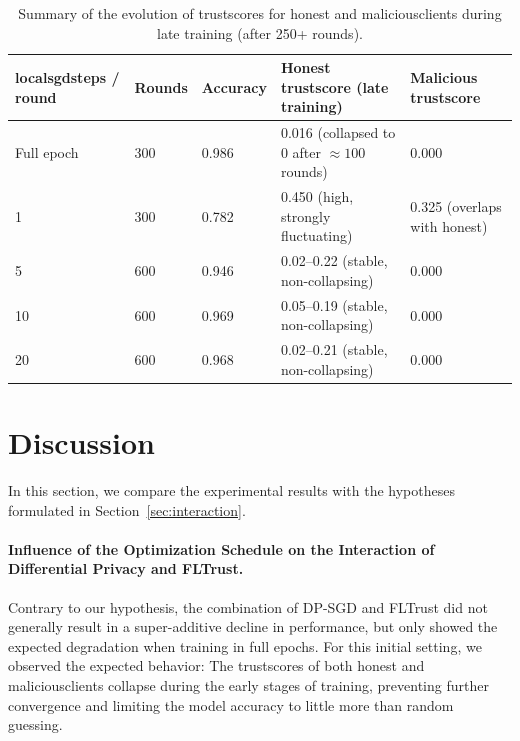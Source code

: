 \documentclass[11pt,twocolumn,a4paper,DIV=calc,parskip=half]{scrartcl}
\begin{document}
	\begin{table}[!h]
		\centering
		
		\begin{tabularx}{\textwidth}{|l|l|l|X|X|}
			\hline
			\textbf{\Glspl{localsgdstep} / round} & \textbf{Rounds} & \textbf{Accuracy} & \textbf{Honest \gls{trustscore} (late training)} & \textbf{Malicious \gls{trustscore}} \\ \hline
			Full epoch & 300 & 0.986 & 0.016 (collapsed to 0 after $\approx100$ rounds) & 0.000 \\ \hline
			1 & 300 & 0.782 & 0.450 (high, strongly fluctuating) & 0.325 (overlaps with honest) \\ \hline
			5 & 600 & 0.946 & 0.02–0.22 (stable, non-collapsing) & 0.000 \\ \hline
			10 & 600 & 0.969 & 0.05–0.19 (stable, non-collapsing) & 0.000 \\ \hline
			20 & 600 & 0.968 & 0.02–0.21 (stable, non-collapsing) & 0.000 \\ \hline
		\end{tabularx}
		\caption{Summary of the evolution of \glspl{trustscore} for honest and \glspl{maliciousclient} during late training (after 250+ rounds).}
		\label{tab:trustScoresBatches}
	\end{table}
	
\section{Discussion}
\label{sec:discussion}

	In this section, we compare the experimental results with the hypotheses formulated in Section~\ref{sec:interaction}.
	
	\paragraph{Influence of the Optimization Schedule on the Interaction of Differential Privacy and FLTrust.}
	Contrary to our hypothesis, the combination of \ac{DP-SGD} and FLTrust did not generally result in a super-additive decline in performance, but only showed the expected degradation when training in full epochs. For this initial setting, we observed the expected behavior: The \glspl{trustscore} of both honest and \glspl{maliciousclient} collapse during the early stages of training, preventing further convergence and limiting the model accuracy to little more than random guessing.
	
\end{document}
